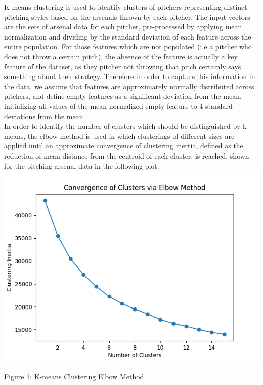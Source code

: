 \documentclass[12 pt]{article}
\begin{document}
\indent K-means clustering is used to identify clusters of pitchers representing 
distinct pitching styles based on the arsenals thrown by each pitcher. The input 
vectors are the sets of arsenal data for each pitcher, pre-processed by applying mean normalization and 
dividing by the standard deviation of each feature across the entire population. For those 
features which are not populated (i.e a pitcher who does not throw a certain pitch), the absence of the 
feature is actually a key feature of the dataset, as they pitcher not throwing that pitch certainly says something about their strategy.
Therefore in order to capture this information in the data, we assume that features are approximately normally distributed 
across pitchers, and define empty features as a significant deviation from the mean, initializing all values of the
mean normalized empty feature to 4 standard deviations from the mean.
 \\ \indent In order to identify the number of clusters which should be distinguished by k-means, the 
elbow method is used in which clusterings of different sizes are applied until 
an approximate convergence of clustering inertia, defined as the reduction of mean distance from the centroid of each cluster, 
is reached, shown for the pitching arsenal data in the following plot:\\

\includegraphics{figs/cls_iner.png}
\begin{center}Figure 1: K-means Clustering Elbow Method\end{center}
\end{document}
